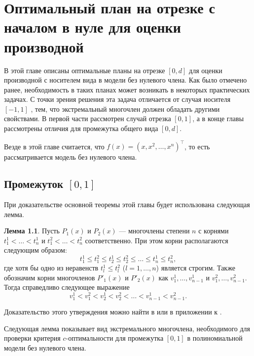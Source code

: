 \documentclass[specialist,
               substylefile = spbu.rtx,
               subf,href,colorlinks=true, 12pt]{disser}
\theoremstyle{definition}
\newtheorem{lemma}{Лемма}
\begin{document}
	
	
  
	\chapter{Оптимальный план на отрезке с началом в нуле для оценки производной}
  
  В этой главе описаны оптимальные планы на отрезке $[0, d]$ для оценки производной с носителем вида в модели без нулевого члена. Как было отмечено ранее, необходимость в таких планах может возникать в некоторых практических задачах. С точки зрения решения эта задача отличается от случая носителя $[-1, 1]$ \cite{melasmain}, тем, что экстремальный многочлен должен обладать другими свойствами. В первой части рассмотрен случай отрезка $[0,1]$, а в конце главы рассмотрены отличия для промежутка общего вида $[0, d]$.
  
  Везде в этой главе считается, что $f(x) = (x, x^2, \ldots, x^n)^\top$, то есть рассматривается модель без нулевого члена.
  
  \section{Промежуток $[0, 1]$}
  
  При доказательстве основной теоремы этой главы будет использована следующая лемма.
  
  \begin{lemma}
  \label{lemma:droots}
  	Пусть $P_1(x)$ и $P_2(x)$ --- многочлены степени $n$ с корнями $t^1_1 < \ldots < t^1_n$ и $t^2_1 < \ldots < t^2_n$ соответственно. При этом корни располагаются следующим образом:
  	\begin{equation*}
  		t^1_1 \leqslant t^2_1 \leqslant t^1_2 \leqslant t^2_2 \leqslant \ldots \leqslant t^1_n \leqslant t^2_n,
  	\end{equation*}
  	где хотя бы одно из неравенств $t_l^1 \leqslant t_l^2$ ($l = 1, \ldots, n$) является строгим. Также обозначим корни многочленов $P'_1(x)$ и $P'_2(x)$ как $v_1^1, \ldots, v_{n-1}^1$ и $v_1^2, \ldots, v_{n-1}^2$. Тогда справедливо следующее выражение
  	\begin{equation*}
  		v^1_1 < v^2_1 < v^1_2 < v^2_2 < \ldots < v^1_{n-1} < v^2_{n-1}.
  	\end{equation*}
  \end{lemma}
  Доказательство этого утверждения можно найти в \cite{sahmphd} или в приложении к \cite{melasmain}.
  
  Следующая лемма показывает вид экстремального многочлена, необходимого для проверки критерия $c$-оптимальности для промежутка $[0, 1]$ в полиномиальной модели без нулевого члена.
  
\end{document}
